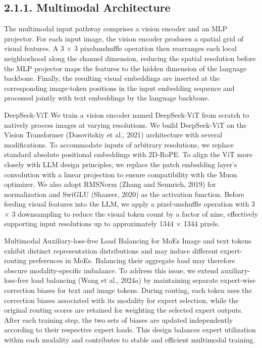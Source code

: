 \documentclass[
  10
]{article}
\begin{document}
\subsection{2.1.1. Multimodal
Architecture}\label{multimodal-architecture}

The multimodal input pathway comprises a vision encoder and an MLP
projector. For each input image, the vision encoder produces a spatial
grid of visual features. A 3 $\times$ 3 pixelunshuffle operation then
rearranges each local neighborhood along the channel dimension, reducing
the spatial resolution before the MLP projector maps the features to the
hidden dimension of the language backbone. Finally, the resulting visual
embeddings are inserted at the corresponding image-token positions in
the input embedding sequence and processed jointly with text embeddings
by the language backbone.

DeepSeek-ViT We train a vision encoder named DeepSeek-ViT from scratch
to natively process images at varying resolutions. We build DeepSeek-ViT
on the Vision Transformer (Dosovitskiy et al., 2021) architecture with
several modifications. To accommodate inputs of arbitrary resolutions,
we replace standard absolute positional embeddings with 2D-RoPE. To
align the ViT more closely with LLM design principles, we replace the
patch embedding layer's convolution with a linear projection to ensure
compatibility with the Muon optimizer. We also adopt RMSNorm (Zhang and
Sennrich, 2019) for normalization and SwiGLU (Shazeer, 2020) as the
activation function. Before feeding visual features into the LLM, we
apply a pixel-unshuffle operation with 3 $\times$ 3 downsampling to reduce the
visual token count by a factor of nine, effectively supporting input
resolutions up to approximately 1344 $\times$ 1344 pixels.

Multimodal Auxiliary-loss-free Load Balancing for MoEs Image and text
tokens exhibit distinct representation distributions and may induce
different expert-routing preferences in MoEs. Balancing their aggregate
load may therefore obscure modality-specific imbalance. To address this
issue, we extend auxiliary-loss-free load balancing (Wang et al., 2024a)
by maintaining separate expert-wise correction biases for text and image
tokens. During routing, each token uses the correction biases associated
with its modality for expert selection, while the original routing
scores are retained for weighting the selected expert outputs. After
each training step, the two sets of biases are updated independently
according to their respective expert loads. This design balances expert
utilization within each modality and contributes to stable and efficient
multimodal training.
\end{document}
